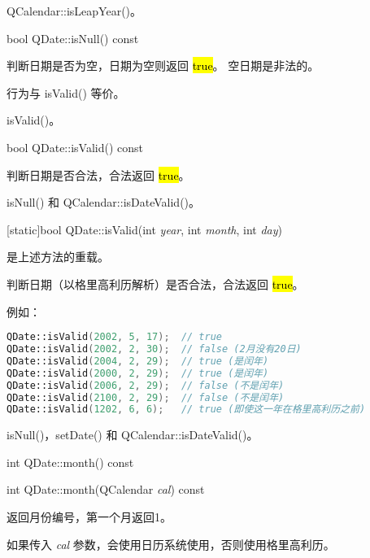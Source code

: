 \begin{seeAlso}
QCalendar::isLeapYear()。
\end{seeAlso}

\splitLine

bool QDate::isNull() const

判断日期是否为空，日期为空则返回 \hl{true}。 空日期是非法的。

\begin{notice}
行为与 isValid() 等价。
\end{notice}

\begin{seeAlso}
isValid()。
\end{seeAlso}

\splitLine

bool QDate::isValid() const

判断日期是否合法，合法返回 \hl{true}。



\begin{seeAlso}
isNull() 和 QCalendar::isDateValid()。
\end{seeAlso}

\splitLine

[static]bool QDate::isValid(int \emph{year}, int \emph{month}, int \emph{day})

是上述方法的重载。

判断日期（以格里高利历解析）是否合法，合法返回 \hl{true}。

例如：

\begin{lstlisting}[language=C++]
QDate::isValid(2002, 5, 17);  // true
QDate::isValid(2002, 2, 30);  // false (2月没有20日)
QDate::isValid(2004, 2, 29);  // true (是闰年)
QDate::isValid(2000, 2, 29);  // true (是闰年)
QDate::isValid(2006, 2, 29);  // false (不是闰年)
QDate::isValid(2100, 2, 29);  // false (不是闰年)
QDate::isValid(1202, 6, 6);   // true (即使这一年在格里高利历之前)
\end{lstlisting}


\begin{seeAlso}
isNull()，setDate() 和 QCalendar::isDateValid()。
\end{seeAlso}

\splitLine

int QDate::month() const

int QDate::month(QCalendar \emph{cal}) const

返回月份编号，第一个月返回1。

如果传入 \emph{cal} 参数，会使用日历系统使用，否则使用格里高利历。


